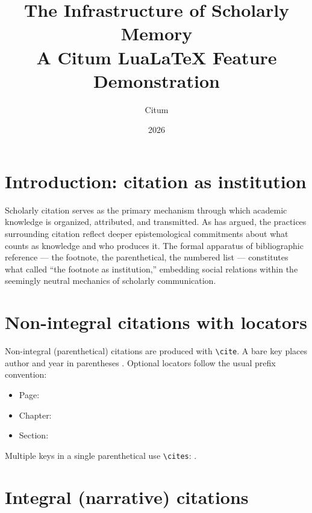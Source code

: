 \documentclass{article}
\title{The Infrastructure of Scholarly Memory\\
       {\large A Citum Lua\LaTeX{} Feature Demonstration}}
\author{Citum}
\date{2026}
\begin{document}
\maketitle

\section{Introduction: citation as institution}

Scholarly citation serves as the primary mechanism through which academic
knowledge is organized, attributed, and transmitted.
As \textcite{chen2017} has argued, the practices surrounding citation
reflect deeper epistemological commitments about what counts as knowledge
and who produces it.
The formal apparatus of bibliographic reference --- the footnote, the
parenthetical, the numbered list --- constitutes what \textcite{webb1968}
called ``the footnote as institution,'' embedding social relations within
the seemingly neutral mechanics of scholarly communication.

\section{Non-integral citations with locators}

Non-integral (parenthetical) citations are produced with \verb|\cite|.
A bare key places author and year in parentheses \cite{chen2017}.
Optional locators follow the usual prefix convention:

\begin{itemize}
  \item Page: \cite[p.~42]{chen2017}
  \item Chapter: \cite[ch.~3]{webb1968}
  \item Section: \cite[sect.~2]{okafor2024}
\end{itemize}

Multiple keys in a single parenthetical use \verb|\cites|:
\cites{chen2017, okafor2024}.

\section{Integral (narrative) citations}
\end{document}
